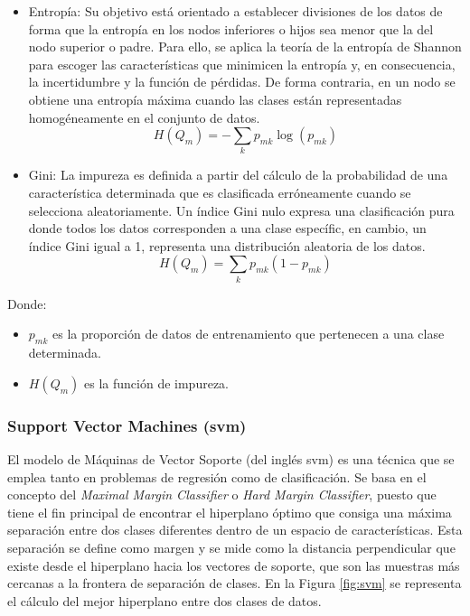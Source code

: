 \begin{itemize}
    \item Entropía: Su objetivo está orientado a establecer divisiones de los datos de forma que la entropía en los nodos inferiores o hijos sea menor que la del nodo superior o padre. Para ello, se aplica la teoría de la entropía de Shannon \cite{rfmedium2} para escoger las características que minimicen la entropía y, en consecuencia, la incertidumbre y la función de pérdidas. De forma contraria, en un nodo se obtiene una entropía máxima cuando las clases están representadas homogéneamente en el conjunto de datos.
    \[H(Q_m) = - \sum_k p_{mk} \log(p_{mk})\]
    \item Gini: La impureza es definida a partir del cálculo de la probabilidad de una característica determinada que es clasificada erróneamente cuando se selecciona aleatoriamente. Un índice Gini nulo expresa una clasificación pura donde todos los datos corresponden a una clase específic, en cambio, un índice Gini igual a 1, representa una distribución aleatoria de los datos.
    \[H(Q_m) = \sum_k p_{mk} (1 - p_{mk})\]
\end{itemize}

Donde:
\begin{itemize}
    \renewcommand{\labelitemi}{}
    \item \(p_{mk}\) es la proporción de datos de entrenamiento que pertenecen a una clase determinada.
    \item \(H(Q_m)\) es la función de impureza.
\end{itemize}


\subsubsection{Support Vector Machines (\acrshort{svm})}
\label{sec:mlsvm}

El modelo de Máquinas de Vector Soporte (del inglés \gls{svm}) es una técnica que se emplea tanto en problemas de regresión como de clasificación. Se basa en el concepto del \textit{Maximal Margin Classifier} o \textit{Hard Margin Classifier}, puesto que tiene el fin principal de encontrar el hiperplano óptimo que consiga una máxima separación entre dos clases diferentes dentro de un espacio de características. Esta separación se define como margen y se mide como la distancia perpendicular que existe desde el hiperplano hacia los vectores de soporte, que son las muestras más cercanas a la frontera de separación de clases. En la Figura \ref{fig:svm} se representa el cálculo del mejor hiperplano entre dos clases de datos. \cite{svmmedium2} \cite{svmciencia}

